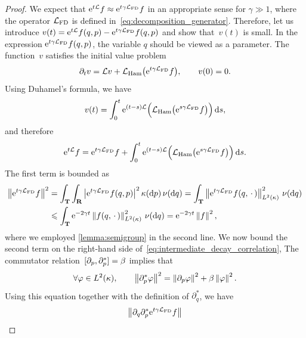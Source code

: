 \documentclass[11pt,a4paper]{article}
\begin{document}
\begin{proof}
    We expect that $\mathrm{e}^{t \mathcal L} f \approx \mathrm{e}^{t \gamma \mathcal L_{\rm FD}} f$ in an appropriate sense for $\gamma \gg 1$,
    where the operator $\mathcal L_{\rm FD}$ is defined in~\eqref{eq:decomposition_generator}.
    Therefore, let us introduce $v(t) = \mathrm{e}^{t \mathcal L} f(q, p) - \mathrm{e}^{t \gamma \mathcal L_{\rm FD}} f(q, p)$
    and show that~$v(t)$ is small.
    In the expression $\mathrm{e}^{t \gamma \mathcal L_{\rm FD}} f(q, p)$,
    the variable $q$ should be viewed as a parameter.
    The function~$v$ satisfies the initial value problem
    \[
        \partial_t v = \mathcal L v +  \mathcal L_{\rm Ham} \bigl(\mathrm{e}^{t \gamma \mathcal L_{\rm FD}} f\bigr), \qquad v(0) = 0.
    \]
    Using Duhamel's formula, we have
    \[
        v(t) = \int_{0}^{t} \mathrm{e}^{(t-s) \mathcal L}  \Bigl( \mathcal L_{\rm Ham} \bigl(\mathrm{e}^{s \gamma \mathcal L_{\rm FD}} f\bigr) \Bigr) \, \mathrm d s,
    \]
    and therefore
    \begin{equation}
        \label{eq:intermediate_decay_correlation}
        \mathrm{e}^{t \mathcal L} f =  \mathrm{e}^{t \gamma \mathcal L_{\rm FD}} f
        + \int_{0}^{t} \mathrm{e}^{(t-s) \mathcal L}  \Bigl( \mathcal L_{\rm Ham} \bigl(\mathrm{e}^{s \gamma \mathcal L_{\rm FD}} f\bigr) \Bigr) \, \mathrm d s.
    \end{equation}
    The first term is bounded as
    \begin{align}
        \notag
        \norm{\e^{t \gamma \mathcal L_{\rm FD}} f}^2
        &= \int_{\torus} \int_{\real}  \abs{\e^{t \gamma \mathcal L_{\rm FD}} f(q, p) }^2 \kappa(\d p) \,\nu(\d q)
        = \int_{\torus} \norm{\e^{t \gamma \mathcal L_{\rm FD}} f(q, \dummy) }[L^2(\kappa)]^2 \, \nu(\d q) \\
        \label{eq:bound_first_term}
        &\leq \int_{\torus} \e^{-2 \gamma t} \norm{f(q, \dummy) }[L^2(\kappa)]^2 \, \nu(\d q)
        = \e^{-2\gamma t} \norm{f}^2,
    \end{align}
    where we employed \cref{lemma:semigroup} in the second line.
    We now bound the second term on the right-hand side of~\eqref{eq:intermediate_decay_correlation},
    The commutator relation~$[\partial_p, \partial_p^*] = \beta$ implies that
    \[
        \forall \varphi \in L^2(\kappa), \qquad
        \norm{\partial_p^* \varphi}^2 = \norm{\partial_p \varphi}^2 + \beta \norm{\varphi}^2.
    \]
    Using this equation together with the definition of $\partial_q^*$,
    we have
    \begin{align*}
        \norm{\partial_q \partial_p^* \e^{t \gamma \mathcal L_{\rm FD}} f}

\end{align*}
\end{proof}
\end{document}
